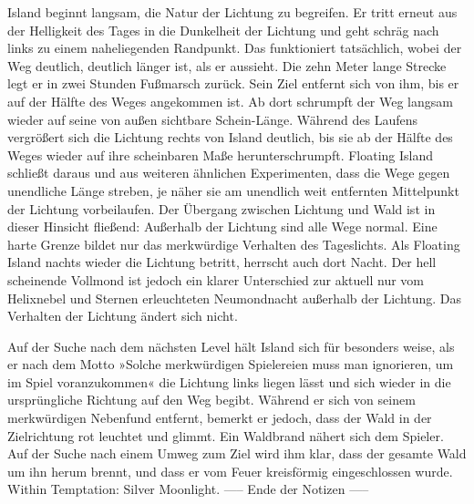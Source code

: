     Island beginnt langsam, die Natur der Lichtung zu begreifen. Er tritt erneut aus der Helligkeit des Tages in die Dunkelheit der Lichtung und geht schräg nach links zu einem naheliegenden Randpunkt. Das funktioniert tatsächlich, wobei der Weg deutlich, deutlich länger ist, als er aussieht. Die zehn Meter lange Strecke legt er in zwei Stunden Fußmarsch zurück. Sein Ziel entfernt sich von ihm, bis er auf der Hälfte des Weges angekommen ist. Ab dort schrumpft der Weg langsam wieder auf seine von außen sichtbare Schein-Länge. Während des Laufens vergrößert sich die Lichtung rechts von Island deutlich, bis sie ab der Hälfte des Weges wieder auf ihre scheinbaren Maße herunterschrumpft. Floating Island schließt daraus und aus weiteren ähnlichen Experimenten, dass die Wege gegen unendliche Länge streben, je näher sie am unendlich weit entfernten Mittelpunkt der Lichtung vorbeilaufen. Der Übergang zwischen Lichtung und Wald ist in dieser Hinsicht fließend: Außerhalb der Lichtung sind alle Wege normal. Eine harte Grenze bildet nur das merkwürdige Verhalten des Tageslichts.
    Als Floating Island nachts wieder die Lichtung betritt, herrscht auch dort Nacht. Der hell scheinende Vollmond ist jedoch ein klarer Unterschied zur aktuell nur vom Helixnebel und Sternen erleuchteten Neumondnacht außerhalb der Lichtung. Das Verhalten der Lichtung ändert sich nicht.

    Auf der Suche nach dem nächsten Level hält Island sich für besonders weise, als er nach dem Motto »Solche merkwürdigen Spielereien muss man ignorieren, um im Spiel voranzukommen« die Lichtung links liegen lässt und sich wieder in die ursprüngliche Richtung auf den Weg begibt. Während er sich von seinem merkwürdigen Nebenfund entfernt, bemerkt er jedoch, dass der Wald in der Zielrichtung rot leuchtet und glimmt. Ein Waldbrand nähert sich dem Spieler. Auf der Suche nach einem Umweg zum Ziel wird ihm klar, dass der gesamte Wald um ihn herum brennt, und dass er vom Feuer kreisförmig eingeschlossen wurde.
    Within Temptation: Silver Moonlight.
----- Ende der Notizen -----

























